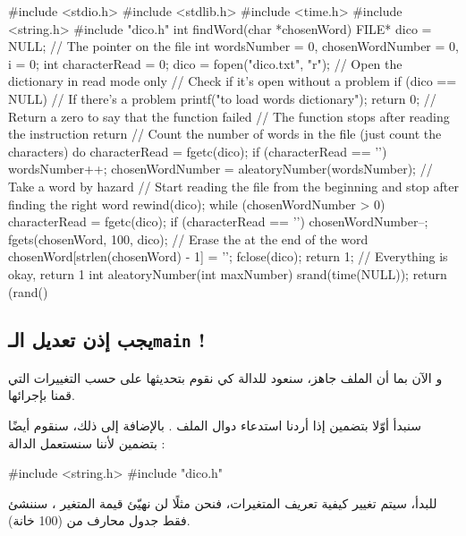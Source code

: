 \begin{Csource}
#include <stdio.h>
#include <stdlib.h>
#include <time.h>
#include <string.h>
#include "dico.h"
int findWord(char *chosenWord)
{
    FILE* dico = NULL; // The pointer on the file
    int wordsNumber = 0, chosenWordNumber = 0, i = 0;
    int characterRead = 0;
    dico = fopen("dico.txt", "r"); // Open the dictionary in read mode only
    // Check if it's open without a problem
    if (dico == NULL) // If there's a problem
    {
        printf("\nImpossible to load words dictionary");
        return 0; // Return a zero to say that the function failed
        // The function stops after reading the instruction return
    }
    // Count the number of words in the file (just count the \n characters)
    do
    {
        characterRead = fgetc(dico);
        if (characterRead == '\n')
            wordsNumber++;
    }
    chosenWordNumber = aleatoryNumber(wordsNumber); // Take a word by hazard
    // Start reading the file from the beginning and stop after finding the right word
    rewind(dico);
    while (chosenWordNumber > 0)
    {
        characterRead = fgetc(dico);
        if (characterRead == '\n')
            chosenWordNumber--;
    }
    fgets(chosenWord, 100, dico);
    // Erase the \n at the end of the word
    chosenWord[strlen(chosenWord) - 1] = '\0';
    fclose(dico);
    return 1; // Everything is okay, return 1
}
int aleatoryNumber(int maxNumber)
{
    srand(time(NULL));
    return (rand() %
}
\end{Csource}

\subsection{يجب إذن تعديل الـ\texttt{main}
!}

و الآن بما أن الملف
جاهز، سنعود للدالة
كي نقوم بتحديثها على حسب التغييرات التي قمنا بإجرائها.

سنبدأ أوّلا بتضمين
إذا أردنا استدعاء دوال الملف
.
بالإضافة إلى ذلك، سنقوم أيضًا بتضمين
لأننا سنستعمل الدالة
 :

\begin{Csource}
#include <string.h>
#include "dico.h"
\end{Csource}

للبدأ، سيتم تغيير كيفية تعريف المتغيرات، فنحن مثلًا لن نهيّئ قيمة المتغير
،
سننشئ فقط جدول محارف من
(100 خانة).

